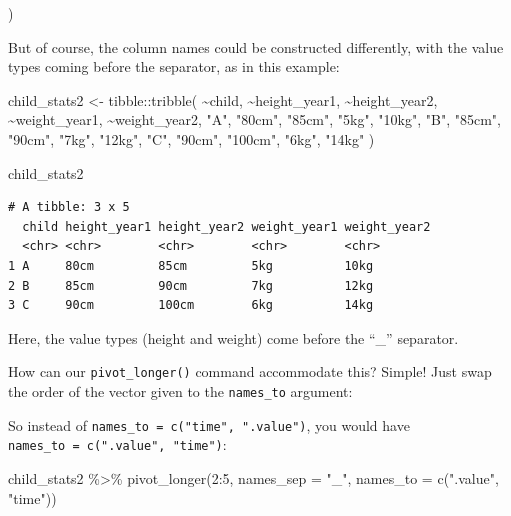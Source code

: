 \documentclass[
  letterpaper,
  DIV=11,
  numbers=noendperiod]{scrreprt}
\newenvironment{Shaded}{\begin{snugshade}}{\end{snugshade}}
\newcommand{\AttributeTok}[1]{\textcolor[rgb]{0.40,0.45,0.13}{#1}}
\newcommand{\DecValTok}[1]{\textcolor[rgb]{0.68,0.00,0.00}{#1}}
\newcommand{\FunctionTok}[1]{\textcolor[rgb]{0.28,0.35,0.67}{#1}}
\newcommand{\NormalTok}[1]{\textcolor[rgb]{0.00,0.23,0.31}{#1}}
\newcommand{\OtherTok}[1]{\textcolor[rgb]{0.00,0.23,0.31}{#1}}
\newcommand{\SpecialCharTok}[1]{\textcolor[rgb]{0.37,0.37,0.37}{#1}}
\newcommand{\StringTok}[1]{\textcolor[rgb]{0.13,0.47,0.30}{#1}}
\begin{document}
)

But of course, the column names could be constructed differently, with
the value types coming before the separator, as in this example:

\begin{Shaded}
\begin{Highlighting}[]
\NormalTok{child\_stats2 }\OtherTok{\textless{}{-}} 
\NormalTok{  tibble}\SpecialCharTok{::}\FunctionTok{tribble}\NormalTok{(}
    \SpecialCharTok{\textasciitilde{}}\NormalTok{child, }\SpecialCharTok{\textasciitilde{}}\NormalTok{height\_year1, }\SpecialCharTok{\textasciitilde{}}\NormalTok{height\_year2, }\SpecialCharTok{\textasciitilde{}}\NormalTok{weight\_year1, }\SpecialCharTok{\textasciitilde{}}\NormalTok{weight\_year2,}
       \StringTok{"A"}\NormalTok{,        }\StringTok{"80cm"}\NormalTok{,        }\StringTok{"85cm"}\NormalTok{,         }\StringTok{"5kg"}\NormalTok{,        }\StringTok{"10kg"}\NormalTok{,}
       \StringTok{"B"}\NormalTok{,        }\StringTok{"85cm"}\NormalTok{,        }\StringTok{"90cm"}\NormalTok{,         }\StringTok{"7kg"}\NormalTok{,        }\StringTok{"12kg"}\NormalTok{,}
       \StringTok{"C"}\NormalTok{,        }\StringTok{"90cm"}\NormalTok{,       }\StringTok{"100cm"}\NormalTok{,         }\StringTok{"6kg"}\NormalTok{,        }\StringTok{"14kg"}
\NormalTok{    )}

\NormalTok{child\_stats2}
\end{Highlighting}
\end{Shaded}

\begin{verbatim}
# A tibble: 3 x 5
  child height_year1 height_year2 weight_year1 weight_year2
  <chr> <chr>        <chr>        <chr>        <chr>       
1 A     80cm         85cm         5kg          10kg        
2 B     85cm         90cm         7kg          12kg        
3 C     90cm         100cm        6kg          14kg        
\end{verbatim}

Here, the value types (height and weight) come before the ``\_''
separator.

How can our \texttt{pivot\_longer()} command accommodate this? Simple!
Just swap the order of the vector given to the \texttt{names\_to}
argument:

So instead of \texttt{names\_to\ =\ c("time",\ ".value")}, you would
have \texttt{names\_to\ =\ c(".value",\ "time")}:

\begin{Shaded}
\begin{Highlighting}[]
\NormalTok{child\_stats2 }\SpecialCharTok{\%\textgreater{}\%} 
  \FunctionTok{pivot\_longer}\NormalTok{(}\DecValTok{2}\SpecialCharTok{:}\DecValTok{5}\NormalTok{, }
               \AttributeTok{names\_sep =} \StringTok{"\_"}\NormalTok{,}
               \AttributeTok{names\_to =} \FunctionTok{c}\NormalTok{(}\StringTok{".value"}\NormalTok{, }\StringTok{"time"}\NormalTok{))}
\end{Highlighting}
\end{Shaded}
\end{document}
